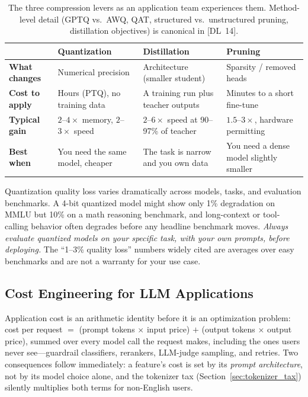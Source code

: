 \begin{table}[H]
\centering
\small
\begin{tabularx}{\textwidth}{@{}l X X X@{}}
\toprule
& \textbf{Quantization} & \textbf{Distillation} & \textbf{Pruning} \\
\midrule
\textbf{What changes} & Numerical precision & Architecture (smaller student) & Sparsity / removed heads \\
\textbf{Cost to apply} & Hours (PTQ), no training data & A training run plus teacher outputs & Minutes to a short fine-tune \\
\textbf{Typical gain} & $2$--$4\times$ memory, $2$--$3\times$ speed & $2$--$6\times$ speed at 90--97\% of teacher & $1.5$--$3\times$, hardware permitting \\
\textbf{Best when} & You need the same model, cheaper & The task is narrow and you own data & You need a dense model slightly smaller \\
\bottomrule
\end{tabularx}
\caption{The three compression levers as an application team experiences them.
Method-level detail (GPTQ vs.\ AWQ, QAT, structured vs.\ unstructured pruning,
distillation objectives) is canonical in [DL~14].}
\label{tab:quantization_tradeoffs}
\label{tab:compression_comparison}
\end{table}

\begin{warningbox}
Quantization quality loss varies dramatically across models, tasks, and
evaluation benchmarks.  A 4-bit quantized model might show only 1\%
degradation on MMLU but 10\% on a math reasoning benchmark, and long-context
or tool-calling behavior often degrades before any headline benchmark moves.
\emph{Always evaluate quantized models on your specific task, with your own
prompts, before deploying.}  The ``1--3\% quality loss'' numbers widely cited
are averages over easy benchmarks and are not a warranty for your use case.
\end{warningbox}

\subsection{Cost Engineering for LLM Applications}
\label{sec:cost_engineering}

Application cost is an arithmetic identity before it is an optimization
problem: cost per request $=$ (prompt tokens $\times$ input price) $+$ (output
tokens $\times$ output price), summed over every model call the request makes,
including the ones users never see---guardrail classifiers, rerankers,
LLM-judge sampling, and retries.  Two consequences follow immediately: a
feature's cost is set by its \emph{prompt architecture}, not by its model
choice alone, and the tokenizer tax (Section~\ref{sec:tokenizer_tax}) silently
multiplies both terms for non-English users.


